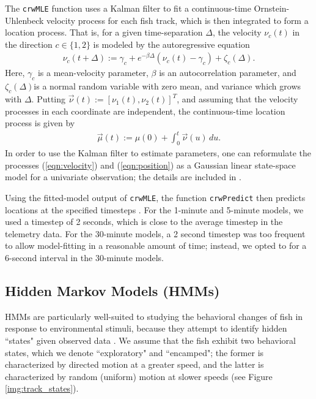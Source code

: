 \documentclass[12pt]{article}
\begin{document}
	The \texttt{crwMLE} function uses a Kalman filter to fit a continuous-time Ornstein-Uhlenbeck velocity process for each fish track, which is then integrated to form a location process. That is, for a given time-separation $\Delta$, the velocity $\nu_c(t)$ in the direction $c \in \{1, 2\}$ is modeled by the autoregressive equation
	\begin{align}
		\nu_c(t + \Delta) := \gamma_c + e^{-\beta \Delta} (\nu_c(t) - \gamma_c) + \zeta_c(\Delta). \label{eqn:velocity}
	\end{align}
	Here, $\gamma_c$ is a mean-velocity parameter, $\beta$ is an autocorrelation parameter, and $\zeta_c(\Delta)$is a normal random variable with zero mean, and variance which grows with $\Delta$. Putting $\vec \nu(t) := [\nu_1(t), \nu_2(t)]^T$, and assuming that the velocity processes in each coordinate are independent, the continuous-time location process is given by
	\begin{align}
		\vec \mu(t) := \mu(0) + \int_0^t \vec \nu(u) \, du. \label{eqn:position}
	\end{align}
	In order to use the Kalman filter to estimate parameters, one can reformulate the processes (\ref{eqn:velocity}) and (\ref{eqn:position}) as a Gaussian linear state-space model for a univariate observation; the details are included in \cite{Johnson2008}.
	
	Using the fitted-model output of \texttt{crwMLE}, the function \texttt{crwPredict} then predicts locations at the specified timesteps \cite{crawl, Johnson2008}. For the 1-minute and 5-minute models, we used a timestep of 2 seconds, which is close to the average timestep in the telemetry data. For the 30-minute models, a 2 second timestep was too frequent to allow model-fitting in a reasonable amount of time; instead, we opted to for a 6-second interval in the 30-minute models.
	
	\subsection{Hidden Markov Models (HMMs)}
	
	HMMs are particularly well-suited to studying the behavioral changes of fish in response to environmental stimuli, because they attempt to identify hidden ``states" given observed data \cite{Rabiner1989}. We assume that the fish exhibit two behavioral states, which we denote ``exploratory" and ``encamped"; the former is characterized by directed motion at a greater speed, and the latter is characterized by random (uniform) motion at slower speeds (see Figure \ref{img:track_states}).
	
\end{document}
